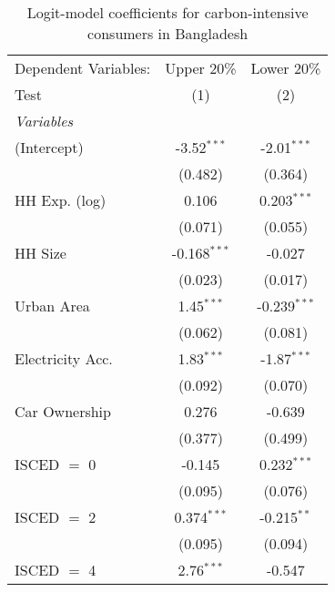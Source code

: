 
\begin{table}[htbp!]
   \centering
   \small
   \begin{adjustbox}{width = 1\textwidth, max height = 0.95\textheight, center}
      \begin{threeparttable}[b]
         \caption{\label{tab:Logit_1_BGD} Logit-model coefficients for carbon-intensive consumers in Bangladesh}
         \begin{tabular}{lcc}
            \tabularnewline \midrule \midrule
            Dependent Variables: & Upper 20\%     & Lower 20\%\\   
            Test                 & (1)            & (2)\\  
            \midrule
            \emph{Variables}\\
            (Intercept)          & -3.52$^{***}$  & -2.01$^{***}$\\   
                                 & (0.482)        & (0.364)\\   
            HH Exp. (log)        & 0.106          & 0.203$^{***}$\\   
                                 & (0.071)        & (0.055)\\   
            HH Size              & -0.168$^{***}$ & -0.027\\   
                                 & (0.023)        & (0.017)\\   
            Urban Area           & 1.45$^{***}$   & -0.239$^{***}$\\   
                                 & (0.062)        & (0.081)\\   
            Electricity Acc.     & 1.83$^{***}$   & -1.87$^{***}$\\   
                                 & (0.092)        & (0.070)\\   
            Car Ownership        & 0.276          & -0.639\\   
                                 & (0.377)        & (0.499)\\   
            ISCED $=$ 0          & -0.145         & 0.232$^{***}$\\   
                                 & (0.095)        & (0.076)\\   
            ISCED $=$ 2          & 0.374$^{***}$  & -0.215$^{**}$\\   
                                 & (0.095)        & (0.094)\\   
            ISCED $=$ 4          & 2.76$^{***}$   & -0.547\\   

\end{tabular}
\end{threeparttable}
\end{adjustbox}
\end{table}
